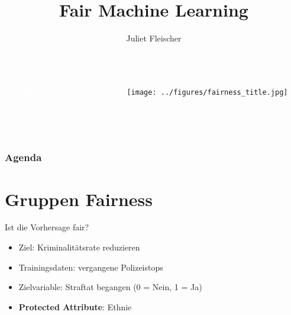 \documentclass[aspectratio=169]{beamer}
\title{Fair Machine Learning}
\author{Juliet Fleischer} %
\institute[LMU]{LMU} %
{

}
\newcommand{\FirstAgendaSlide}{
  \begin{frame}[plain]
    \frametitle{Agenda}
    \setcounter{tocdepth}{1}
    \tableofcontents[sectionstyle=show/show, pausesubsections=false]
  \end{frame}
}
\begin{document}
{
\begin{frame}
\begin{columns}
	\begin{column}{0.4\textwidth}
		\vspace{2.5cm}
		
		\textbf{\textcolor{white}{\Large Fair Machine Learning}}
		\vspace{1cm}
		
		\textcolor{white}{\footnotesize Juliet Fleischer \\
			\today}
	\end{column}
	\begin{column}{0.49\textwidth}
		\vspace{3cm}
		\begin{center}
			\texttt{[image: ../figures/fairness\_title.jpg]}
		\end{center}
	\end{column}
\end{columns}
\end{frame}
}

\FirstAgendaSlide


\section{Gruppen Fairness}
\begin{frame}{Ist die Vorhersage fair?}
    \begin{itemize}
		\item<1-> Ziel: Kriminalitätsrate reduzieren
        \item<2-> Trainingsdaten: vergangene Polizeistops
        \item<3-> Zielvariable: Straftat begangen  (0 = Nein, 1 = Ja)
        \item<4-> \textbf{Protected Attribute}: Ethnie
    \end{itemize}
\end{frame}
\end{document}
